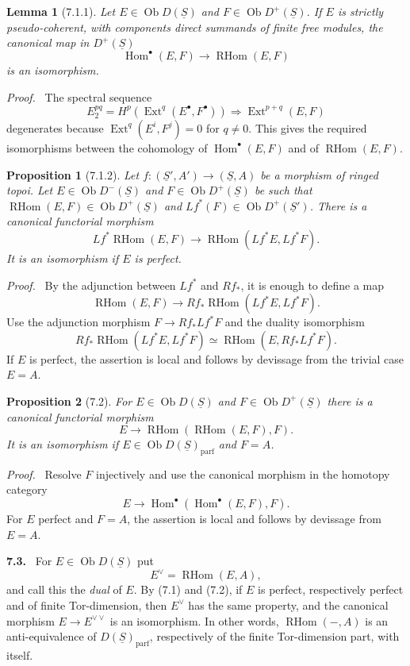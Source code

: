 \documentclass[11pt]{article}
\theoremstyle{plain}
\newtheorem*{proposition*}{Proposition}
\newtheorem*{lemma*}{Lemma}
\theoremstyle{definition}
\theoremstyle{remark}
\newenvironment{statement}[1]{\par\medskip\noindent\textbf{#1.}\ }{\par\medskip}
\newenvironment{prooftext}{\par\noindent\textit{Proof.}\ }{\par\medskip}
\DeclareMathOperator{\Hom}{Hom}
\DeclareMathOperator{\Ext}{Ext}
\DeclareMathOperator{\ob}{Ob}
\DeclareMathOperator{\RHom}{RHom}
\providecommand{\uS}{\underline{S}}
\begin{document}
\begin{lemma*}[7.1.1]
Let $E\in\ob D(\uS)$ and $F\in\ob D^+(\uS)$. If $E$ is strictly pseudo-coherent, with components direct summands of finite free modules, the canonical map in $D^+(\uS)$
\[
\Hom^\bullet(E,F)\longrightarrow\RHom(E,F)
\]
is an isomorphism.
\end{lemma*}

\begin{prooftext}
The spectral sequence
\[
E_2^{pq}=H^p(\Ext^q(E^\bullet,F^\bullet))\Rightarrow \Ext^{p+q}(E,F)
\]
degenerates because $\Ext^q(E^i,F^j)=0$ for $q\ne0$. This gives the required isomorphisms between the cohomology of $\Hom^\bullet(E,F)$ and of $\RHom(E,F)$.
\end{prooftext}

\begin{proposition*}[7.1.2]
Let $f:(\uS',A')\to(\uS,A)$ be a morphism of ringed topoi. Let $E\in\ob D^-(\uS)$ and $F\in\ob D^+(\uS)$ be such that $\RHom(E,F)\in\ob D^+(\uS)$ and $Lf^*(F)\in\ob D^+(\uS')$. There is a canonical functorial morphism
\[
Lf^*\RHom(E,F)
\longrightarrow
\RHom(Lf^*E,Lf^*F).
\]
It is an isomorphism if $E$ is perfect.
\end{proposition*}

\begin{prooftext}
By the adjunction between $Lf^*$ and $Rf_*$, it is enough to define a map
\[
\RHom(E,F)\longrightarrow Rf_*\RHom(Lf^*E,Lf^*F).
\]
Use the adjunction morphism $F\to Rf_*Lf^*F$ and the duality isomorphism
\[
Rf_*\RHom(Lf^*E,Lf^*F)
\simeq
\RHom(E,Rf_*Lf^*F).
\]
If $E$ is perfect, the assertion is local and follows by devissage from the trivial case $E=A$.
\end{prooftext}

\begin{proposition*}[7.2]
For $E\in\ob D(\uS)$ and $F\in\ob D^+(\uS)$ there is a canonical functorial morphism
\[
E\longrightarrow\RHom(\RHom(E,F),F).
\]
It is an isomorphism if $E\in\ob D(\uS)_{\mathrm{parf}}$ and $F=A$.
\end{proposition*}

\begin{prooftext}
Resolve $F$ injectively and use the canonical morphism in the homotopy category
\[
E\longrightarrow\Hom^\bullet(\Hom^\bullet(E,F),F).
\]
For $E$ perfect and $F=A$, the assertion is local and follows by devissage from $E=A$.
\end{prooftext}

\begin{statement}{7.3}
For $E\in\ob D(\uS)$ put
\[
E^\vee=\RHom(E,A),
\]
and call this the \emph{dual} of $E$. By (7.1) and (7.2), if $E$ is perfect, respectively perfect and of finite Tor-dimension, then $E^\vee$ has the same property, and the canonical morphism $E\to E^{\vee\vee}$ is an isomorphism. In other words, $\RHom(-,A)$ is an anti-equivalence of $D(\uS)_{\mathrm{parf}}$, respectively of the finite Tor-dimension part, with itself.
\end{statement}
\end{document}
